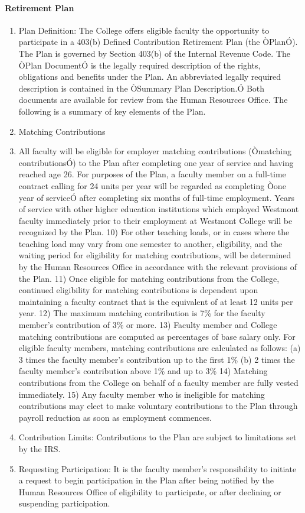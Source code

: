 \documentclass[letterpaper, 11pt]{article}
\begin{document}
			\paragraph{Retirement Plan}
				\begin{enumerate}[label=\alph*)]
					\item{Plan Definition:  The College offers eligible faculty the opportunity to participate in a 403(b) Defined Contribution Retirement Plan (the ÒPlanÓ).  The Plan is governed by Section 403(b) of the Internal Revenue Code.  The ÒPlan DocumentÓ is the legally required description of the rights, obligations and benefits under the Plan.  An abbreviated legally required description is contained in the ÒSummary Plan Description.Ó  Both documents are available for review from the Human Resources Office.  The following is a summary of key elements of the Plan.}
					\item{Matching Contributions}
					\item{All faculty will be eligible for employer matching contributions (Òmatching contributionsÓ) to the Plan after completing one year of service and having reached age 26.  For purposes of the Plan, a faculty member on a full-time contract calling for 24 units per year will be regarded as completing Òone year of serviceÓ after completing six months of full-time employment.  Years of service with other higher education institutions which employed Westmont faculty immediately prior to their employment at Westmont College will be recognized by the Plan.}
					10) For other teaching loads, or in cases where the teaching load may vary from one semester to another, eligibility, and the waiting period for eligibility for matching contributions, will be determined by the Human Resources Office in accordance with the relevant provisions of the Plan.
					11) Once eligible for matching contributions from the College, continued eligibility for matching contributions is dependent upon maintaining a faculty contract that is the equivalent of at least 12 units per year.
					12) The maximum matching contribution is 7\% for the faculty member's contribution of 3\% or more.
					13) Faculty member and College matching contributions are computed as percentages of base salary only.  For eligible faculty members, matching contributions are calculated as follows:
					(a) 3 times the faculty member's contribution up to the first 1\%
					(b) 2 times the faculty member's contribution above 1\% and up to 3\%
					14) Matching contributions from the College on behalf of a faculty member are fully vested immediately.
					15) Any faculty member who is ineligible for matching contributions may elect to make voluntary contributions to the Plan through payroll reduction as soon as employment commences.
					\item{Contribution Limits:  Contributions to the Plan are subject to limitations set by the IRS.}
					\item{Requesting Participation:  It is the faculty member's responsibility to initiate a request to begin participation in the Plan after being notified by the Human Resources Office of eligibility to participate, or after declining or suspending participation.}
				\end{enumerate}
\end{document}
